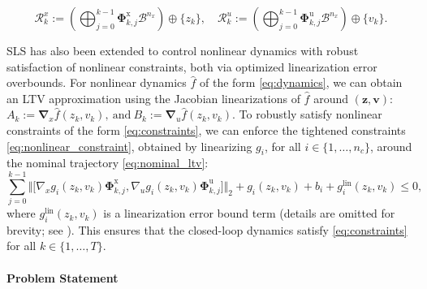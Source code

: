 \documentclass{l4dc2026}
\newcommand{\Px}{\bm{\Phi}^{\mathrm{x}}}
\newcommand{\Pu}{\bm{\Phi}^{\mathrm{u}}}
\begin{document}
\vspace{-5pt}
\begin{equation}\label{eq:sls_tubes}\textstyle
    \mathcal{R}^{x}_k := (\bigoplus_{j=0}^{k-1}\Px_{k,j}\mathcal{B}^{n_x})\oplus \{z_k\}, \quad \mathcal{R}^{u}_k := (\bigoplus_{j=0}^{k-1}\Pu_{k,j}\mathcal{B}^{n_x})\oplus \{v_k\}.
\end{equation}
\vspace{-15pt}

\noindent SLS has also been extended to control nonlinear dynamics \citep{leeman2025robust_TAC,zhan2025robustly} with robust satisfaction of nonlinear constraints, both via optimized linearization error overbounds. For nonlinear dynamics $\hat f$ of the form \eqref{eq:dynamics}, we can obtain an LTV approximation
using the Jacobian linearizations of $\hat f$ around $(\textbf{z}, \textbf{v})$: $A_k:= \bm{\nabla}_x \hat{f}\left(z_k, v_k\right),~\text{and}~B_k:=\bm{\nabla}_u \hat{f}\left(z_k, v_k\right)$.
To robustly satisfy nonlinear constraints of the form \eqref{eq:constraints}, we can enforce the tightened constraints \eqref{eq:nonlinear_constraint}, obtained by linearizing $g_i$, for all $i \in \{1,\ldots, n_c\}$, around the nominal trajectory \eqref{eq:nominal_ltv}: 
\begin{equation}\label{eq:nonlinear_constraint}\textstyle
\sum_{j=0}^{k-1}\big\Vert\big[\nabla_xg_i(z_k,v_k)\Px_{k,j}, \nabla_ug_i(z_k,v_k)\Pu_{k,j}\big]\big\Vert_{2} + g_i(z_k,v_k) + b_i +g_i^\textrm{lin}(z_k,v_k) \leq 0,
\end{equation}
where $g_i^\textrm{lin}(z_k,v_k)$ is a linearization error bound term (details are omitted for brevity; see \cite[Eq. (22)]{zhan2025robustly}). This ensures that the closed-loop dynamics satisfy \eqref{eq:constraints} for all $k \in \{1,\ldots,T\}$.

\paragraph{Problem Statement}
\end{document}
